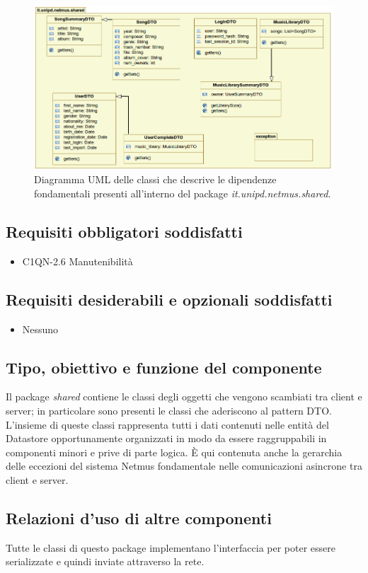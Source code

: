\begin{figure}[!h]
  \centering
  \includegraphics[width=15cm]{img/DP/classes_shared.png}
\caption{Diagramma UML delle classi che descrive le dipendenze
fondamentali presenti all'interno del package
\emph{it.unipd.netmus.shared}.}
\end{figure}

\subsection*{Requisiti obbligatori soddisfatti}
\begin{itemize}
  	\item C1QN-2.6 Manutenibilit\`a
\end{itemize}
\subsection*{Requisiti desiderabili e opzionali soddisfatti}
\begin{itemize}
    \item Nessuno
\end{itemize}
\subsection*{Tipo, obiettivo e funzione del componente}
Il package \emph{shared} contiene le classi degli oggetti che vengono
scambiati tra client e server; in particolare sono presenti le classi che
aderiscono al pattern DTO. L'insieme di queste classi rappresenta tutti i
dati contenuti nelle entit\`a del Datastore opportunamente organizzati in modo
da essere raggruppabili in componenti minori e prive di parte logica.
\`E qui contenuta anche la gerarchia delle eccezioni del sistema Netmus
fondamentale nelle comunicazioni asincrone tra client e server.
\subsection*{Relazioni d'uso di altre componenti} Tutte le classi di questo
package implementano l'interfaccia  per poter essere
serializzate e quindi inviate attraverso la rete. 
